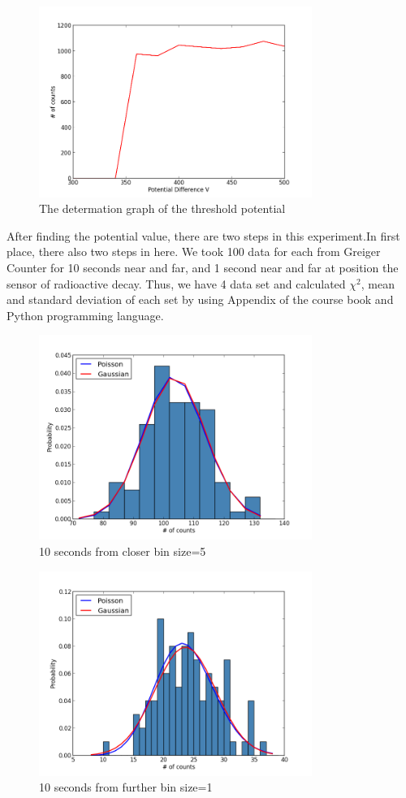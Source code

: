 \documentclass[aps,twocolumn,secnumarabic,nobalancelastpage,amsmath,amssymb,
nofootinbib]{revtex4}
\begin{document}
\begin{figure}[htbp]
\includegraphics[width=3.5in]{potential}
\caption{The determation graph of the threshold potential}
\end{figure}

After finding the potential value, there are two steps in this experiment.In first place, there also two steps in here.
We took 100 data for each from Greiger Counter for 10 seconds near and far, and 1 second near and far at position the sensor of radioactive decay. Thus, we have 4 data set and calculated ${\chi}^{2}$, mean and standard deviation of each set by using Appendix of the course book and Python programming language.

\begin{figure}[htbp]
\includegraphics[width=3.5in]{tc}
\caption{10 seconds from closer bin size=5}
\end{figure}

\begin{figure}[htbp]
\includegraphics[width=3.5in]{tf}
\caption{10 seconds from further bin size=1}
\end{figure}
\end{document}
